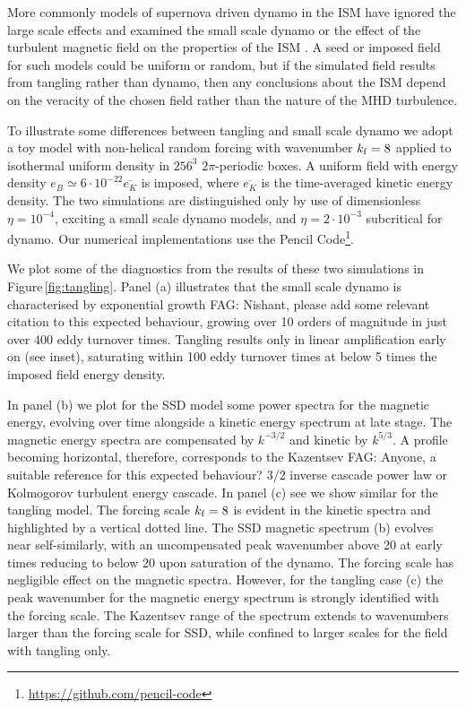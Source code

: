 \documentclass[preprint2]{aastex63}
\newcommand\kf{k_{\rm f} }
\newcommand{\fag}[1]{\textcolor{midgreen}{FAG: #1}}
\begin{document}
More commonly models of supernova driven dynamo in the ISM have ignored the 
large scale effects and examined the small scale dynamo or the effect of the
turbulent magnetic field on the properties of the ISM
\citep[e.g.,][]{BKMM04,BalKim05,MacLow:2005}.
A seed or imposed field for such models could be uniform or random, but if the
simulated field results from tangling rather than dynamo, then any conclusions
about the ISM depend on the veracity of the chosen field rather than the 
nature of the MHD turbulence.

To illustrate some differences between tangling and small scale dynamo we adopt
a toy model with non-helical random forcing with wavenumber $\kf=8$ applied to
isothermal uniform density in $256^3$ $2\pi$-periodic boxes.
A uniform field with energy density $e_B\simeq6\cdot10^{-22}\overline{e_K}$ is
imposed, where $\overline{e_K}$ is the time-averaged kinetic energy density.
The two simulations are distinguished only by use of dimensionless 
$\eta=10^{-4}$, exciting a 
small scale dynamo models, and $\eta=2\cdot10^{-3}$ subcritical for dynamo.
Our numerical implementations use the {\sc Pencil Code}\footnote{
\url{https://github.com/pencil-code}}.

We plot some of the diagnostics from the results of these two simulations in 
Figure\,\ref{fig:tangling}.
Panel (a) illustrates that the small scale dynamo 
is characterised by exponential growth \fag{Nishant, please add some relevant citation to this expected behaviour}, growing over 10 orders of magnitude in 
just over 400 eddy turnover times.
Tangling results only in linear amplification
early on (see inset), saturating within 100 eddy turnover times at below 5 times
the imposed field energy density.

In panel (b) we plot for the SSD model some power spectra for the magnetic
energy, evolving over time alongside a kinetic energy spectrum at late stage.
The magnetic energy spectra are compensated by $k^{-3/2}$ and kinetic by
$k^{5/3}$.
A profile becoming horizontal, therefore, corresponds to the Kazentsev 
\fag{Anyone, a suitable reference for this expected behaviour?} $3/2$ inverse
cascade power law or Kolmogorov turbulent energy cascade.
In panel (c) see we show similar for the tangling model.
The forcing scale $\kf=8$ is evident in the kinetic spectra and highlighted by 
a vertical dotted line.
The SSD magnetic spectrum (b) evolves near self-similarly, with an 
uncompensated peak
wavenumber above 20 at early times reducing to below 20 upon saturation of the
dynamo.
The forcing scale has negligible effect on the magnetic spectra.
However, for the tangling case (c) the peak wavenumber for the magnetic energy
spectrum is strongly identified with the forcing scale.
The Kazentsev range of the spectrum extends to wavenumbers larger than the 
forcing scale for SSD, while confined to larger scales for the field with
tangling only. 
\end{document}
